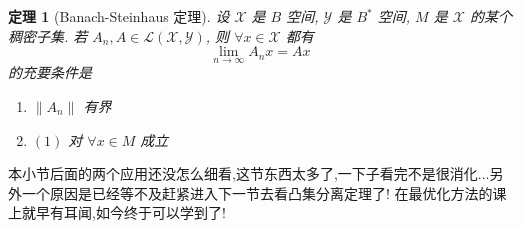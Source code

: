 \documentclass[12pt,a4paper]{article}
\newtheorem{thm}{定理}[subsection]  %
\begin{document}
\begin{thm}[Banach-Steinhaus 定理]
    设 $\mathscr{X}$ 是 $B$ 空间, $\mathscr{Y}$ 是 $B^*$ 空间, $M$ 是 $\mathscr{X}$ 的某个稠密子集. 
    若 $A_n, A \in \mathscr{L}(\mathscr{X}, \mathscr{Y})$, 则 $\forall x \in \mathscr{X}$ 都有
    \begin{equation}
        \lim_{n \to \infty} A_n x = Ax
    \end{equation}
    的充要条件是
    \begin{enumerate}
        \item $\|A_n\|$ 有界
        \item $(1)$ 对 $\forall x \in M$ 成立
    \end{enumerate}
\end{thm}
本小节后面的两个应用还没怎么细看,这节东西太多了,一下子看完不是很消化...另外一个原因是已经等不及赶紧进入下一节去看凸集分离定理了!
在最优化方法的课上就早有耳闻,如今终于可以学到了!
\end{document}

